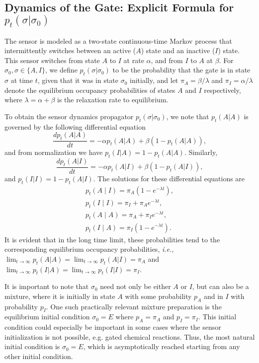 \subsection{Dynamics of the Gate: Explicit Formula for $p_{t}(\sigma|\sigma_0)$} \label{S1}

The sensor is modeled as a two-state continuous-time Markov process that intermittently switches between an active ($A$) state and an inactive ($I$) state. This sensor switches from state $A$ to $I$ at rate $\alpha$, and from $I$ to $A$ at $\beta$. For $\sigma_0, \sigma \in \{A,I\}$, we define  $p_{t}(\sigma|\sigma_0)$ to be the probability that the gate is in state $\sigma$ at time $t$, given that it was in state $\sigma_0$ initially, and let $\pi_A=\beta / \lambda$ and $\pi_I=\alpha / \lambda$ denote the equilibrium occupancy probabilities of states $A$ and $I$ respectively, where $\lambda=\alpha+\beta$ is the relaxation rate to equilibrium. 

To obtain the sensor dynamics propagator $p_{t}(\sigma|\sigma_0)$, we note that $p_{t}(A|A)$ is governed by the following differential equation
\begin{equation} 
\frac{d p_{t}(A|A)}{d t} = -\alpha p_{t}(A|A) + \beta \left(1-p_{t}(A|A)\right),
\end{equation}
and from normalization we have $p_{t}(I|A)=1-p_{t}(A|A)$. Similarly,
\begin{equation} 
\frac{d p_{t}(A|I)}{d t} = -\alpha p_{t}(A|I) + \beta \left(1-p_{t}(A|I)\right),
\end{equation}
and $p_{t}(I|I)=1-p_{t}(A|I)$. The solutions for these differential equations are
\begin{equation} \label{internal_propagator}
  \begin{array}{ll}
   p_t(A \mid I) =\pi_{A}(1-e^{-\lambda t}) ,     \\
   p_t(I \mid I) =\pi_{I}+\pi_{A}e^{-\lambda t}  ,     \\
   p_t(A \mid A) =\pi_{A}+\pi_{I}e^{-\lambda t},     \\
   p_t(I \mid A) =\pi_{I}(1-e^{-\lambda t}).  
  \end{array}
\end{equation}
It is evident that in the long time limit, these probabilities tend to the corresponding equilibrium occupancy probabilities, \emph{i.e.,} $\lim_{t\to \infty} p_t(A|A) = \lim_{t\to \infty} p_t(A|I) = \pi_A$ and $\lim_{t\to \infty} p_t(I|A) = \lim_{t\to \infty} p_t(I|I) = \pi_I$.

It is important to note that $\sigma_0$ need not only be either $A$ or $I$, but can also be a mixture, where it is initially in state $A$ with some probability $p_A$ and in $I$ with probability $p_I$. One such practically relevant mixture preparation is the equilibrium initial condition $\sigma_0 = E$ where $p_A = \pi_A$ and $p_I = \pi_I$. This initial condition could especially be important in some cases where the sensor initialization is not possible, e.g. gated chemical reactions. Thus, the most natural initial condition is $\sigma_0 = E$, which is asymptotically reached starting from any other initial condition.

